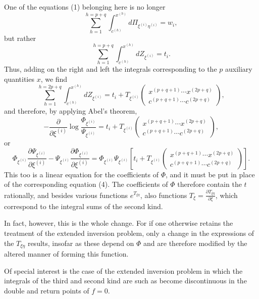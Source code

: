 \documentclass[10pt]{article}
\begin{document}
One of the equations (1) belonging here is no longer
\[
\sum_{h=1}^{h=p+q}\int_{c^{(h)}}^{x^{(h)}}d\Pi_{\xi^{(i)}\eta^{(i)}}=w_i,
\]
but rather
\[
\sum_{h=1}^{h=p+q}\int_{c^{(h)}}^{x^{(h)}}dZ_{\xi^{(i)}}=t_i.
\]
Thus, adding on the right and left the integrals corresponding to the \(p\) auxiliary quantities \(x\), we find
\[
\sum_{h=1}^{h=2p+q}\int_{c^{(h)}}^{x^{(h)}}dZ_{\xi^{(i)}}=t_i+T_{\xi^{(i)}}\begin{pmatrix}x^{(p+q+1)}\cdots x^{(2p+q)}\\c^{(p+q+1)}\cdots c^{(2p+q)}\end{pmatrix},
\]
and therefore, by applying Abel's theorem,
\[
-\frac{\partial}{\partial\xi^{(i)}}\log\frac{\Phi_{\xi^{(i)}}}{\Psi_{\xi^{(i)}}}
=t_i+T_{\xi^{(i)}}\begin{pmatrix}x^{(p+q+1)}\cdots x^{(2p+q)}\\c^{(p+q+1)}\cdots c^{(2p+q)}\end{pmatrix},
\]
or
\begingroup\footnotesize
\[
\Phi_{\xi^{(i)}}\frac{\partial\Psi_{\xi^{(i)}}}{\partial\xi^{(i)}}
-\Psi_{\xi^{(i)}}\frac{\partial\Phi_{\xi^{(i)}}}{\partial\xi^{(i)}}
=\Phi_{\xi^{(i)}}\Psi_{\xi^{(i)}}
\left[t_i+T_{\xi^{(i)}}\begin{pmatrix}x^{(p+q+1)}\cdots x^{(2p+q)}\\c^{(p+q+1)}\cdots c^{(2p+q)}\end{pmatrix}\right].
\]
\endgroup
This too is a linear equation for the coefficients of \(\Phi\), and it must be put in place of the corresponding equation (4). The coefficients of \(\Phi\) therefore contain the \(t\) rationally, and besides various functions \(e^{T_{\xi\eta}}\), also functions \(T_\xi=\frac{\partial T_{\xi\eta}}{\partial\xi}\), which correspond to the integral sums of the second kind.

In fact, however, this is the whole change. For if one otherwise retains the treatment of the extended inversion problem, only a change in the expressions of the \(T_{\xi\eta}\) results, insofar as these depend on \(\Phi\) and are therefore modified by the altered manner of forming this function.

Of special interest is the case of the extended inversion problem in which the integrals of the third and second kind are such as become discontinuous in the double and return points of \(f=0\).


\end{document}
